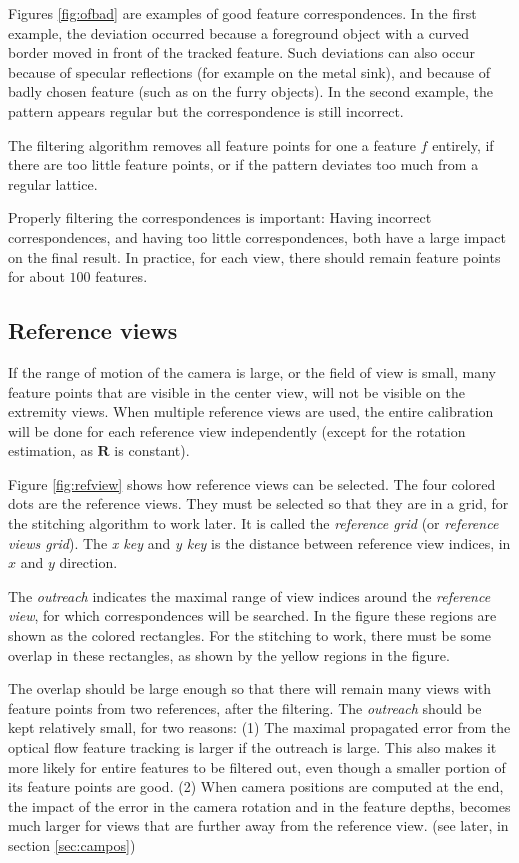 \documentclass{scrreprt}
\newcommand{\matr}[1]{\mathbf{#1}}
\begin{document}
Figures \ref{fig:ofbad} are examples of good feature correspondences. In the first example, the deviation occurred because a foreground object with a curved border moved in front of the tracked feature. Such deviations can also occur because of specular reflections (for example on the metal sink), and because of badly chosen feature (such as on the furry objects). In the second example, the pattern appears regular but the correspondence is still incorrect.

The filtering algorithm removes all feature points for one a feature $f$ entirely, if there are too little feature points, or if the pattern deviates too much from a regular lattice.

Properly filtering the correspondences is important: Having incorrect correspondences, and having too little correspondences, both have a large impact on the final result. In practice, for each view, there should remain feature points for about $100$ features.



\subsection{Reference views}
\label{sec:refviews}
If the range of motion of the camera is large, or the field of view is small, many feature points that are visible in the center view, will not be visible on the extremity views. 
When multiple reference views are used, the entire calibration will be done for each reference view independently (except for the rotation estimation, as $\matr{R}$ is constant).

Figure \ref{fig:refview} shows how reference views can be selected. The four colored dots are the reference views. They must be selected so that they are in a grid, for the stitching algorithm to work later. It is called the \emph{reference grid} (or \emph{reference views grid}). The \emph{x key} and \emph{y key} is the distance between reference view indices, in $x$ and $y$ direction.

The \emph{outreach} indicates the maximal range of view indices around the \emph{reference view}, for which correspondences will be searched. In the figure these regions are shown as the colored rectangles. For the stitching to work, there must be some overlap in these rectangles, as shown by the yellow regions in the figure.

The overlap should be large enough so that there will remain many views with feature points from two references, after the filtering. The \emph{outreach} should be kept relatively small, for two reasons: (1) The maximal propagated error from the optical flow feature tracking is larger if the outreach is large. This also makes it more likely for entire features to be filtered out, even though a smaller portion of its feature points are good. (2) When camera positions are computed at the end, the impact of the error in the camera rotation and in the feature depths, becomes much larger for views that are further away from the reference view. (see later, in section \ref{sec:campos})
\end{document}
